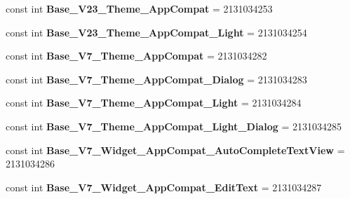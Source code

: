 \begin{DoxyCompactItemize}
\item 
\hypertarget{classClient_1_1Droid_1_1Resource_1_1Style_a38bf4445b626f1c1c64470fbf0a2ceda}{}const int {\bfseries Base\+\_\+\+V23\+\_\+\+Theme\+\_\+\+App\+Compat} = 2131034253\label{classClient_1_1Droid_1_1Resource_1_1Style_a38bf4445b626f1c1c64470fbf0a2ceda}

\item 
\hypertarget{classClient_1_1Droid_1_1Resource_1_1Style_a3aeb06a3ea9d21192779c30b9ccc656d}{}const int {\bfseries Base\+\_\+\+V23\+\_\+\+Theme\+\_\+\+App\+Compat\+\_\+\+Light} = 2131034254\label{classClient_1_1Droid_1_1Resource_1_1Style_a3aeb06a3ea9d21192779c30b9ccc656d}

\item 
\hypertarget{classClient_1_1Droid_1_1Resource_1_1Style_ab46ebeab1935bb7cb6864bd135ab71dc}{}const int {\bfseries Base\+\_\+\+V7\+\_\+\+Theme\+\_\+\+App\+Compat} = 2131034282\label{classClient_1_1Droid_1_1Resource_1_1Style_ab46ebeab1935bb7cb6864bd135ab71dc}

\item 
\hypertarget{classClient_1_1Droid_1_1Resource_1_1Style_a133108a805b6fcbe86dc910888260a86}{}const int {\bfseries Base\+\_\+\+V7\+\_\+\+Theme\+\_\+\+App\+Compat\+\_\+\+Dialog} = 2131034283\label{classClient_1_1Droid_1_1Resource_1_1Style_a133108a805b6fcbe86dc910888260a86}

\item 
\hypertarget{classClient_1_1Droid_1_1Resource_1_1Style_adcf47774ad242832bae49e7176713262}{}const int {\bfseries Base\+\_\+\+V7\+\_\+\+Theme\+\_\+\+App\+Compat\+\_\+\+Light} = 2131034284\label{classClient_1_1Droid_1_1Resource_1_1Style_adcf47774ad242832bae49e7176713262}

\item 
\hypertarget{classClient_1_1Droid_1_1Resource_1_1Style_a12560c95a7b0e417ba84d533739e782f}{}const int {\bfseries Base\+\_\+\+V7\+\_\+\+Theme\+\_\+\+App\+Compat\+\_\+\+Light\+\_\+\+Dialog} = 2131034285\label{classClient_1_1Droid_1_1Resource_1_1Style_a12560c95a7b0e417ba84d533739e782f}

\item 
\hypertarget{classClient_1_1Droid_1_1Resource_1_1Style_af754f41477c2ace87af8221cdab338a6}{}const int {\bfseries Base\+\_\+\+V7\+\_\+\+Widget\+\_\+\+App\+Compat\+\_\+\+Auto\+Complete\+Text\+View} = 2131034286\label{classClient_1_1Droid_1_1Resource_1_1Style_af754f41477c2ace87af8221cdab338a6}

\item 
\hypertarget{classClient_1_1Droid_1_1Resource_1_1Style_a2b34e9a9f34ae7f3a90f92473b1b2907}{}const int {\bfseries Base\+\_\+\+V7\+\_\+\+Widget\+\_\+\+App\+Compat\+\_\+\+Edit\+Text} = 2131034287\label{classClient_1_1Droid_1_1Resource_1_1Style_a2b34e9a9f34ae7f3a90f92473b1b2907}


\end{DoxyCompactItemize}
